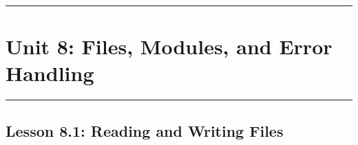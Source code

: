 \documentclass[
  justified,
  openright,
]{tufte-book}
\begin{document}
\begin{center}\rule{0.5\linewidth}{0.5pt}\end{center}

\section{Unit 8: Files, Modules, and Error
Handling}\label{unit-8-files-modules-and-error-handling-1}

\begin{center}\rule{0.5\linewidth}{0.5pt}\end{center}

\subsection{Lesson 8.1: Reading and Writing
Files}\label{lesson-8.1-reading-and-writing-files}
\end{document}

